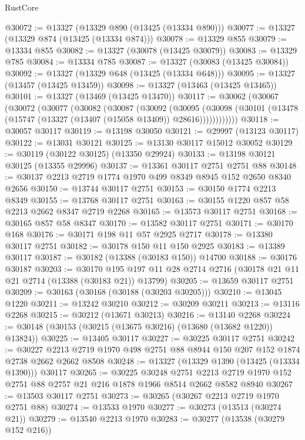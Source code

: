 \begin{lexlean}{RustCore}
\begin{coremodule}
@30072 := @13327 (@13329 @890 (@13425 (@13334 @890)))
@30077 := @13327 (@13329 @874 (@13425 (@13334 @874)))
@30078 := @13329 @855
@30079 := @13334 @855
@30082 := @13327 (@30078 (@13425 @30079))
@30083 := @13329 @785
@30084 := @13334 @785
@30087 := @13327 (@30083 (@13425 @30084))
@30092 := @13327 (@13329 @648 (@13425 (@13334 @648)))
@30095 := @13327 (@13457 (@13425 @13459))
@30098 := @13327 (@13463 (@13425 @13465))
@30101 := @13327 (@13469 (@13425 @13470))
@30117 := @30062
    (@30067
      (@30072
        (@30077
          (@30082
            (@30087
              (@30092
                (@30095
                  (@30098
                    (@30101 (@13478 (@15747 (@13327 (@13407 (@15058 @13409)) @28616))))))))))))
@30118 := @30057 @30117
@30119 := @13198 @30050
@30121 := @29997 (@13123 @30117)
@30122 := @13031 @30121
@30125 := @13130 @30117 @15012 @30052
@30129 := @30119 (@30122 @30125) (@13350 @29924)
@30133 := @13198 @30121 @30125 (@13355 @29996)
@30137 := @13361 @30117 @2751 @2751 @88
@30148 := @30137 @2213 @2719 @1774 @1970 @499 @8349 @8945 @152 @2650 @8340 @2656
@30150 := @13744 @30117 @2751
@30153 := @30150 @1774 @2213 @8349
@30155 := @13768 @30117 @2751
@30163 := @30155 @1220 @857 @58 @2213 @2662 @8347 @2719 @2268
@30165 := @13573 @30117 @2751
@30168 := @30165 @857 @58 @8347
@30170 := @13582 @30117 @2751
@30171 := @30170 @168
@30176 := @30171 @198 @11 @57 @2925 @2717
@30178 := @13380 @30117 @2751
@30182 := @30178 @150 @11 @150 @2925
@30183 := @13389 @30117
@30187 := @30182 (@13388 (@30183 @150)) @14700
@30188 := @30176 @30187
@30203 := @30170
    @195
    @197
    @11
    @28
    @2714
    @2716
    (@30178 @21 @11 @21 @2714 (@13388 (@30183 @21)) @13799)
@30205 := @13659 @30117 @2751
@30209 := @30163 (@30168 (@30188 (@30203 @30205)))
@30210 := @13045 @1220
@30211 := @13242 @30210
@30212 := @30209 @30211
@30213 := @13116 @2268
@30215 := @30212 (@13671 @30213)
@30216 := @13140 @2268
@30224 := @30148 (@30153 (@30215 (@13675 @30216) (@13680 (@13682 @1220)) @13824))
@30225 := @13405 @30117
@30227 := @30225 @30117 @2751
@30242 := @30227 @2213 @2719 @1970 @498 @2751 @88 @8944 @150 @207 @152 @1874 @2738 @2662 @2662 @8508
@30248 := @13327 (@13329 @1390 (@13425 (@13334 @1390))) @30117
@30265 := @30225
    @30248
    @2751
    @2213
    @2719
    @1970
    @152
    @2751
    @88
    @2757
    @21
    @216
    @1878
    @1966
    @8514
    @2662
    @8582
    @8940
@30267 := @13503 @30117 @2751
@30273 := @30265 (@30267 @2213 @2719 @1970 @2751 @88)
@30274 := @13533 @1970
@30277 := @30273 (@13513 (@30274 @21))
@30279 := @13540 @2213 @1970
@30283 := @30277 (@13538 (@30279 @152 @216))

\end{coremodule}
\end{lexlean}
